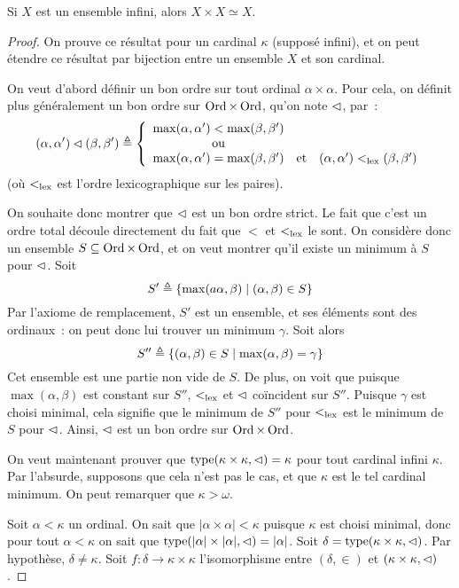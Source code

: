 \begin{theorem}
  Si $X$ est un ensemble infini, alors $X\times X \simeq X$.
\end{theorem}

\begin{proof}
  On prouve ce résultat pour un cardinal $\kappa$ (supposé infini), et on peut
  étendre ce résultat par bijection entre un ensemble $X$ et son cardinal.

  On veut d'abord définir un bon ordre sur tout ordinal $\alpha \times \alpha$.
  Pour cela, on définit plus généralement un bon ordre sur $\operatorname{Ord}\times\operatorname{Ord}$,
  qu'on note $\lhd$, par~:
  \[(\alpha,\alpha')\lhd(\beta,\beta') \triangleq
  \left\{\begin{array}{ccc}
  \max(\alpha,\alpha') < \max(\beta,\beta') & &\\
  \text{ou} & &\\
  \max(\alpha,\alpha') = \max(\beta,\beta')&\text{et}&
  (\alpha,\alpha')<_{\mathrm{lex}} (\beta,\beta')
  \end{array}\right.\]
  (où $<_{\mathrm{lex}}$ est l'ordre lexicographique sur les paires).

  On souhaite donc montrer que $\lhd$ est un bon ordre strict. Le fait que
  c'est un ordre total découle directement du fait que $<$ et $<_{\mathrm{lex}}$ le sont.
  On considère donc un ensemble $S\subseteq \operatorname{Ord}\times \operatorname{Ord}$, et on veut montrer
  qu'il existe un minimum à $S$ pour $\lhd$. Soit
  \[S'\triangleq \{\max(a\alpha,\beta)\mid (\alpha,\beta) \in S\}\]
  Par l'axiome de remplacement, $S'$ est un ensemble, et ses éléments sont des
  ordinaux~: on peut donc lui trouver un minimum $\gamma$. Soit alors
  \[S'' \triangleq \{(\alpha,\beta) \in S\mid \max(\alpha,\beta) = \gamma\}\]
  Cet ensemble est une partie non vide de $S$. De plus, on voit que puisque
  $\max(\alpha,\beta)$ est constant sur $S''$, $<_{\mathrm{lex}}$ et $\lhd$ coïncident
  sur $S''$. Puisque $\gamma$ est choisi minimal, cela signifie que le minimum
  de $S''$ pour $<_{\mathrm{lex}}$ est le minimum de $S$ pour $\lhd$. Ainsi, $\lhd$
  est un bon ordre sur $\operatorname{Ord}\times \operatorname{Ord}$.

  On veut maintenant prouver que $\operatorname{type}(\kappa\times\kappa,\lhd) = \kappa$
  pour tout cardinal infini $\kappa$. Par l'absurde, supposons que cela n'est
  pas le cas, et que $\kappa$ est le tel cardinal minimum. On peut remarquer que
  $\kappa > \omega$.

  Soit $\alpha < \kappa$ un ordinal. On sait que
  $|\alpha \times \alpha| < \kappa$ puisque $\kappa$ est choisi minimal, donc
  pour tout $\alpha < \kappa$ on sait que
  $\operatorname{type}(|\alpha| \times |\alpha|,\lhd) = |\alpha|$. Soit
  $\delta = \operatorname{type}(\kappa\times\kappa,\lhd)$. Par hypothèse,
  $\delta \neq \kappa$. Soit $f : \delta \to \kappa \times \kappa$
  l'isomorphisme entre $(\delta,\in)$ et $(\kappa\times\kappa,\lhd)$.


\end{proof}
